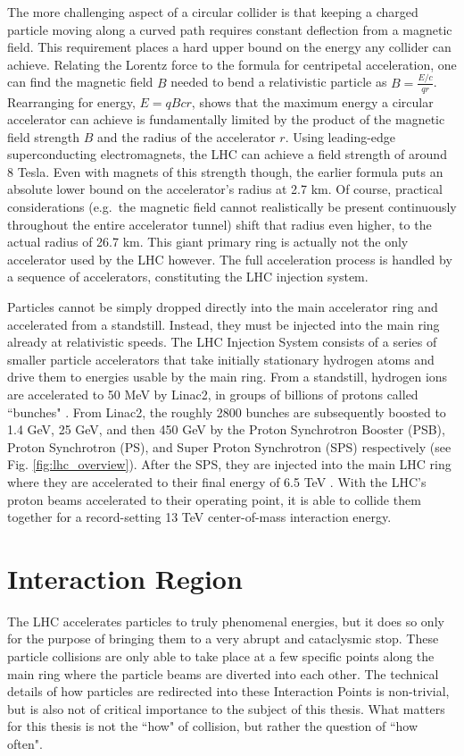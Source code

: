     The more challenging aspect of a circular collider is that keeping a charged particle moving along a curved path requires constant deflection from a magnetic field.
    This requirement places a hard upper bound on the energy any collider can achieve.
    Relating the Lorentz force to the formula for centripetal acceleration, one can find the magnetic field $B$ needed to bend a relativistic particle as $B=\frac{E/c}{q r}$.
    Rearranging for energy, $E = q B c r$, shows that the maximum energy a circular accelerator can achieve is fundamentally limited by the product of the magnetic field strength $B$ and the radius of the accelerator $r$.
    Using leading-edge superconducting electromagnets, the LHC can achieve a field strength of around 8 Tesla.
    Even with magnets of this strength though, the earlier formula puts an absolute lower bound on the accelerator's radius at 2.7 km.
    Of course, practical considerations (e.g.\ the magnetic field cannot realistically be present continuously throughout the entire accelerator tunnel) shift that radius even higher, to the actual radius of 26.7 km.
    This giant primary ring is actually not the only accelerator used by the LHC however.
    The full acceleration process is handled by a sequence of accelerators, constituting the LHC injection system.

    Particles cannot be simply dropped directly into the main accelerator ring and accelerated from a standstill.
    Instead, they must be injected into the main ring already at relativistic speeds.
    The LHC Injection System consists of a series of smaller particle accelerators that take initially stationary hydrogen atoms and drive them to energies usable by the main ring.
    From a standstill, hydrogen ions are accelerated to 50 MeV by Linac2, in groups of billions of protons called ``bunches" \cite{lhc_run2}.
    From Linac2, the roughly 2800 bunches are subsequently boosted to 1.4 GeV, 25 GeV, and then 450 GeV by the Proton Synchrotron Booster (PSB), Proton Synchrotron (PS), and Super Proton Synchrotron (SPS) respectively (see Fig. \ref{fig:lhc_overview}).
    After the SPS, they are injected into the main LHC ring where they are accelerated to their final energy of 6.5 TeV \cite{lhc_machine}.
    With the LHC's proton beams accelerated to their operating point, it is able to collide them together for a record-setting 13 TeV center-of-mass interaction energy.


\section{Interaction Region} \label{sec:lhc-interaction_region}
    The LHC accelerates particles to truly phenomenal energies, but it does so only for the purpose of bringing them to a very abrupt and cataclysmic stop.
    These particle collisions are only able to take place at a few specific points along the main ring where the particle beams are diverted into each other.
    The technical details of how particles are redirected into these Interaction Points is non-trivial, but is also not of critical importance to the subject of this thesis.
    What matters for this thesis is not the ``how" of collision, but rather the question of ``how often".

